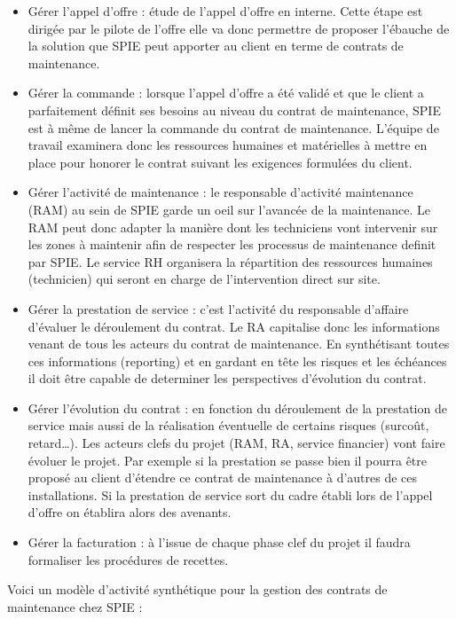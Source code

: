 \begin{itemize}
\item Gérer l'appel d'offre : étude de l'appel d'offre en interne. Cette étape est dirigée par le pilote de l'offre elle va donc permettre de proposer l'ébauche de la solution que SPIE peut apporter au client en terme de contrats de maintenance.
\item Gérer la commande : lorsque l'appel d'offre a été validé et que le client a parfaitement définit ses besoins au niveau du contrat de maintenance, SPIE est à même de lancer la \og commande \fg du contrat de maintenance. L'équipe de travail examinera donc les ressources humaines et matérielles à mettre en place pour honorer le contrat suivant les exigences formulées du client.
\item Gérer l'activité de maintenance : le responsable d'activité maintenance (RAM) au sein de SPIE garde un oeil sur l'avancée de la maintenance. Le RAM peut donc adapter la manière dont les techniciens vont intervenir sur les zones à maintenir afin de respecter les processus de maintenance definit par SPIE. Le service RH organisera la répartition des ressources humaines (technicien) qui seront en charge de l'intervention direct sur site.
\item Gérer la prestation de service : c'est l'activité du responsable d'affaire d'évaluer le déroulement du contrat. Le RA capitalise donc les informations venant de tous les acteurs du contrat de maintenance. En synthétisant toutes ces informations (reporting) et en gardant en tête les risques et les échéances il doit être capable de determiner les perspectives d'évolution du contrat.
\item Gérer l'évolution du contrat : en fonction du déroulement de la prestation de service mais aussi de la réalisation éventuelle de certains risques (surcoût, retard…). Les acteurs clefs du projet (RAM, RA, service financier) vont faire évoluer le projet. Par exemple si la prestation se passe bien il pourra être proposé au client d'étendre ce contrat de maintenance à d'autres de ces installations. Si la prestation de service sort du cadre établi lors de l'appel d'offre on établira alors des avenants.
\item Gérer la facturation : à l'issue de chaque phase clef du projet il faudra formaliser les procédures de recettes. 
\end{itemize}

Voici un modèle d'activité synthétique pour la gestion des contrats de maintenance chez SPIE :


